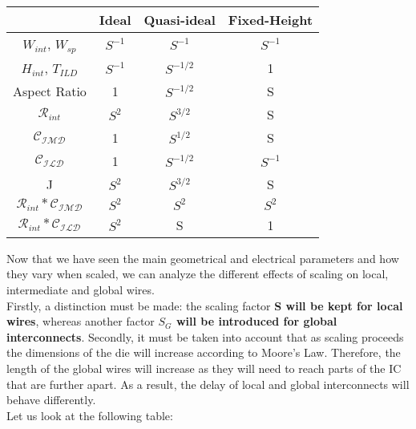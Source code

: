 \documentclass[a4paper, 12pt, twoside, openright]{report}
\begin{document}
\begin{table}[H] {
\begin{center} {
\begin{tabular}{||c|c|c|c||}
\hline
&Ideal&Quasi-ideal&Fixed-Height\\
\hline
$W_{int}$, $W_{sp}$ & $S^{-1}$ & $S^{-1}$ & $S^{-1}$\\
\hline
$H_{int}$, $T_{ILD}$ & $S^{-1}$ & $S^{-1/2}$ & 1\\
\hline
Aspect Ratio & 1 & $S^{-1/2}$ & S\\
\hline
$\mathcal{R}_{int}$ & $S^{2}$ & $S^{3/2}$ & S\\
\hline
$\mathcal{C_{IMD}}$ & 1 & $S^{1/2}$ & S\\
\hline
$\mathcal{C_{ILD}}$ & 1 & $S^{-1/2}$ & $S^{-1}$\\
\hline
J & $S^{2}$ & $S^{3/2}$ & S\\
\hline
$\mathcal{R}_{int}*\mathcal{C_{IMD}}$ & $S^{2}$ & $S^{2}$ & $S^{2}$\\
\hline
$\mathcal{R}_{int}*\mathcal{C_{ILD}}$ & $S^{2}$ & S & 1\\
\hline
\end{tabular} }
\end{center} }
\end{table}

Now that we have seen the main geometrical and electrical parameters and how they vary when scaled, we can analyze the different effects of scaling on local, intermediate and global wires.\\ Firstly, a distinction must be made: the scaling factor \textbf{S will be kept for local wires}, whereas another factor \textbf{$S_{G}$ will be introduced for global interconnects}. Secondly, it must be taken into account that as scaling proceeds the dimensions of the die will increase according to Moore's Law. Therefore, the length of the global wires will increase as they will need to reach parts of the IC that are further apart. As a result, the delay of local and global interconnects will behave differently.\\ Let us look at the following table:
\end{document}
